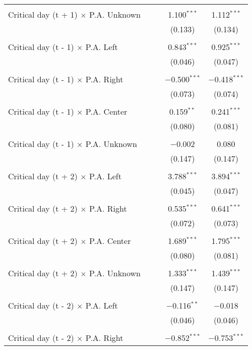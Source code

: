 \documentclass[
]{article}
\begin{document}
\begin{table}[!htbp]
{\begin{tabular}{@{\extracolsep{5pt}}lcccc}
  & & & & \\ 
 Critical day (t + 1) $\times$ P.A. Unknown &  &  & 1.100$^{***}$ & 1.112$^{***}$ \\ 
  &  &  & (0.133) & (0.134) \\ 
  & & & & \\ 
 Critical day (t - 1) $\times$ P.A. Left &  &  & 0.843$^{***}$ & 0.925$^{***}$ \\ 
  &  &  & (0.046) & (0.047) \\ 
  & & & & \\ 
 Critical day (t - 1) $\times$ P.A. Right &  &  & $-$0.500$^{***}$ & $-$0.418$^{***}$ \\ 
  &  &  & (0.073) & (0.074) \\ 
  & & & & \\ 
 Critical day (t - 1) $\times$ P.A. Center &  &  & 0.159$^{**}$ & 0.241$^{***}$ \\ 
  &  &  & (0.080) & (0.081) \\ 
  & & & & \\ 
 Critical day (t - 1) $\times$ P.A. Unknown &  &  & $-$0.002 & 0.080 \\ 
  &  &  & (0.147) & (0.147) \\ 
  & & & & \\ 
 Critical day (t + 2) $\times$ P.A. Left &  &  & 3.788$^{***}$ & 3.894$^{***}$ \\ 
  &  &  & (0.045) & (0.047) \\ 
  & & & & \\ 
 Critical day (t + 2) $\times$ P.A. Right &  &  & 0.535$^{***}$ & 0.641$^{***}$ \\ 
  &  &  & (0.072) & (0.073) \\ 
  & & & & \\ 
 Critical day (t + 2) $\times$ P.A. Center &  &  & 1.689$^{***}$ & 1.795$^{***}$ \\ 
  &  &  & (0.080) & (0.081) \\ 
  & & & & \\ 
 Critical day (t + 2) $\times$ P.A. Unknown &  &  & 1.333$^{***}$ & 1.439$^{***}$ \\ 
  &  &  & (0.147) & (0.147) \\ 
  & & & & \\ 
 Critical day (t - 2) $\times$ P.A. Left &  &  & $-$0.116$^{**}$ & $-$0.018 \\ 
  &  &  & (0.046) & (0.046) \\ 
  & & & & \\ 
 Critical day (t - 2) $\times$ P.A. Right &  &  & $-$0.852$^{***}$ & $-$0.753$^{***}$ \\ 

\end{tabular}}
\end{table}
\end{document}
